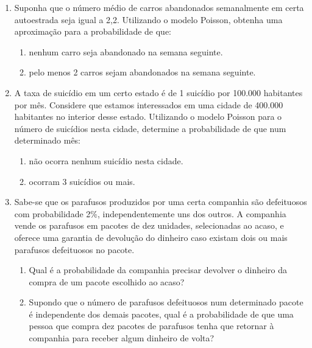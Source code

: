 \documentclass{article}
\begin{document}
\begin{enumerate}
	\item Suponha que o número médio de carros abandonados semanalmente em certa autoestrada seja igual a 2,2. Utilizando o modelo Poisson, obtenha uma aproximação para a probabilidade de que:
	\begin{enumerate}
		\item nenhum carro seja abandonado na semana seguinte.
		
		\item pelo menos 2 carros sejam abandonados na semana seguinte.
	\end{enumerate}
    
	\item A taxa de suicídio em um certo estado é de 1 suicídio por 100.000 habitantes por mês. Considere que estamos interessados em uma cidade de 400.000 habitantes no interior desse estado. Utilizando o modelo Poisson para o número de suicídios nesta cidade, determine a probabilidade de que num determinado mês:
	\begin{enumerate}
		\item não ocorra nenhum suicídio nesta cidade.
		
		\item ocorram 3 suicídios ou mais.
	\end{enumerate}
    
    \item Sabe-se que os parafusos produzidos por uma certa companhia são defeituosos com probabilidade 2\%, independentemente uns dos outros. A companhia vende os parafusos em pacotes de dez unidades, selecionadas ao acaso, e oferece uma garantia de devolução do dinheiro caso existam dois ou mais parafusos defeituosos no pacote.
    \begin{enumerate}
    	\item Qual é a probabilidade da companhia precisar devolver o dinheiro da compra de um pacote escolhido ao acaso?
    	\item Supondo que o número de parafusos defeituosos num determinado pacote é independente dos demais pacotes, qual é a probabilidade de que uma pessoa que compra dez pacotes de parafusos tenha que retornar à companhia para receber algum dinheiro de volta? 
    \end{enumerate}
    

	
		
	
\end{enumerate}
\end{document}
